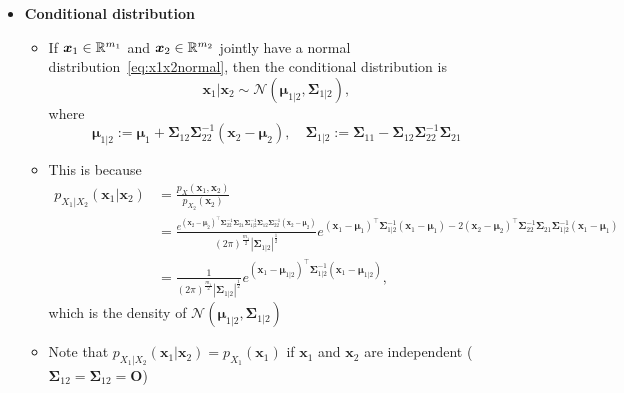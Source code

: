 \documentclass[12pt,a4paper]{article}
\begin{document}
\begin{itemize}
\item \textbf{Conditional distribution}
  \begin{itemize}
  \item If $\bm{x}_{1}\in \mathbb{R}^{m_{1}}$ and $\bm{x}_{2}\in \mathbb{R}^{m_{2}}$ jointly have a normal distribution~\eqref{eq:x1x2normal},
    then the conditional distribution is
    \begin{equation}\nonumber%
      \bm{x}_{1}|\bm{x}_{2} \sim
      \mathcal{N} \left(\bm{\mu}_{1|2}, \bm{\Sigma}_{1|2}\right),
    \end{equation}
    where
    \begin{equation}\nonumber%
      \bm{\mu}_{1|2}:=
      \bm{\mu}_{1}+\bm{\Sigma}_{12}\bm{\Sigma}_{22}^{-1}(\bm{x}_{2}-\bm{\mu}_{2}),
      \quad
      \bm{\Sigma}_{1|2}:=\bm{\Sigma}_{11}- \bm{\Sigma}_{12}\bm{\Sigma}_{22}^{-1}\bm{\Sigma}_{21}
    \end{equation}
  \item This is because
    \begin{align}
      p_{X_{1}|X_{2}}(\bm{x}_{1}|\bm{x}_{2})
        & = \frac{p_{X}(\bm{x}_{1},\bm{x}_{2})}{p_{X_{2}}(\bm{x}_{2})}  \nonumber \\
        & = \frac{e^{(\bm{x}_{2}-\bm{\mu}_{2})^{\top}\bm{\Sigma}_{22}^{-1}\bm{\Sigma}_{21}\bm{\Sigma}_{1|2}^{-1}\bm{\Sigma}_{12}\bm{\Sigma}_{22}^{-1}(\bm{x}_{2}-\bm{\mu}_{2})}}{(2\pi)^{\frac{m_{1}}{2}} |\bm{\Sigma}_{1|2}|^{\frac{1}{2}}}e^{(\bm{x}_{1}-\bm{\mu}_{1})^{\top}\bm{\Sigma}_{1|2}^{-1}(\bm{x}_{1}-\bm{\mu}_{1})-2(\bm{x}_{2}-\bm{\mu}_{2})^{\top}\bm{\Sigma}_{22}^{-1}\bm{\Sigma}_{21}\bm{\Sigma}_{1|2}^{-1}(\bm{x}_{1}-\bm{\mu}_{1})} \nonumber \\
        & = \frac{1}{(2\pi)^{\frac{m_{1}}{2}} |\bm{\Sigma}_{1|2}|^{\frac{1}{2}}}e^{(\bm{x}_{1}-\bm{\mu}_{1|2})^{\top}\bm{\Sigma}_{1|2}^{-1}(\bm{x}_{1}-\bm{\mu}_{1|2})},
    \nonumber%
    \end{align}
    which is the density of $\mathcal{N}(\bm{\mu}_{1|2}, \bm{\Sigma}_{1|2})$
  \item Note that $p_{X_{1}|X_{2}}(\bm{x}_{1}|\bm{x}_{2})=p_{X_{1}}(\bm{x}_{1})$
    if $\bm{x}_{1}$ and $\bm{x}_{2}$ are independent ($\bm{\Sigma}_{12}=\bm{\Sigma}_{12}=\bm{O}$)
  \end{itemize}


\end{itemize}
\end{document}
